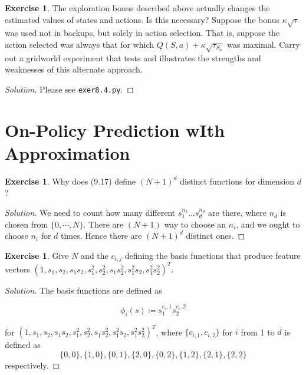\documentclass[oneside,11pt]{article}
\theoremstyle{definition}
\newtheorem{exer}[thm]{Exercise}
\newenvironment{solution}
{\renewcommand\qedsymbol{$\blacksquare$}\begin{proof}[Solution]} {\end{proof}}
\begin{document}
\begin{exer}

The exploration bonus described above actually changes the estimated values of states and actions. Is this necessary? Suppose the bonus $\kappa \sqrt{\tau}$ was used not in backups, but solely in action selection. That is, suppose the action selected was always that for which $Q(S, a) +\kappa \sqrt{\tau_{S_a}}$ was maximal. Carry out a gridworld experiment that tests and illustrates the strengths and weaknesses of this alternate approach.
\end{exer}


\begin{shaded}
\begin{solution} 
Please see \texttt{exer8.4.py}.

\end{solution} 
\end{shaded}



\section{On-Policy Prediction wIth Approximation}


\begin{exer}
Why does (9.17) define $(N + 1)^d$ distinct functions for dimension $d$?
\end{exer}

\begin{shaded}
\begin{solution} 
We need to count how many different $s_1^{n_1} ... s_d^{n_d}$ are there, where $n_d$ is chosen from $\{0, \cdots, N\}$. There are $(N+1)$ way to choose an $n_i$, and we ought to choose $n_i$ for $d$ times. Hence there are $(N + 1)^d$ distinct ones.
\end{solution} 
\end{shaded}


\begin{exer}
Give $N$ and the $c_{i,j}$ defining the basis functions that produce feature
vectors $(1, s_1, s_2, s_1s_2, s_1^2, s_2^2, s_1s_2^2, s_1^2s_2, s_1^2s_2^2)^T$.
\end{exer}

\begin{shaded}
\begin{solution} 
The basis functions are defined as

\[ \phi_i(s) \coloneqq s_1^{c_i,1} s_2^{c_i,2}\]

for $(1, s_1, s_2, s_1s_2, s_1^2, s_2^2, s_1s_2^2, s_1^2s_2, s_1^2s_2^2)^T$, where $\{c_{i,1}, c_{i,2}\}$ for $i$ from 1 to $d$ is defined as
\[ \{0,0\}, \{1,0\}, \{0,1\}, \{2,0\}, \{0,2\}, \{1,2\}, \{2,1\}, \{2,2\}\]
 respectively.

\end{solution} 
\end{shaded}
\end{document}
